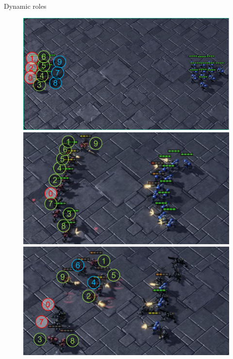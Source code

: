 \documentclass{beamer}
\begin{document}
    \begin{frame}{Dynamic roles}
        \begin{figure}
            \centering
            \includegraphics[height=0.17\linewidth]{img/fig-dynamic_roles/10m_vs_11m-g1.pdf}\hfill
            \includegraphics[height=0.17\linewidth]{img/fig-dynamic_roles/10m_vs_11m-g2.pdf}\hfill
            \includegraphics[height=0.17\linewidth]{img/fig-dynamic_roles/10m_vs_11m-g3.pdf}\\
            \hfill
            \hfill
        \end{figure}
    \end{frame}
\end{document}
